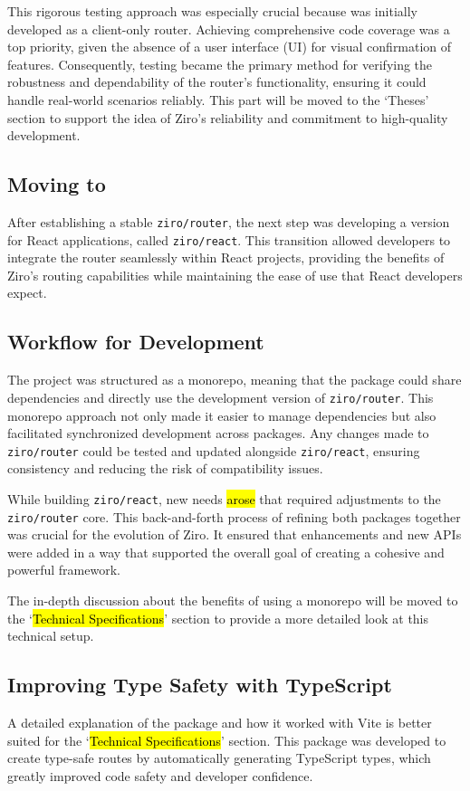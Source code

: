 This rigorous testing approach was especially crucial because  was initially developed as a client-only router. Achieving comprehensive code coverage was a top priority, given the absence of a user interface (UI) for visual confirmation of features. Consequently, testing became the primary method for verifying the robustness and dependability of the router’s functionality, ensuring it could handle real-world scenarios reliably. This part will be moved to the ‘Theses’ section to support the idea of Ziro’s reliability and commitment to high-quality development.

\subsection{Moving to }
After establishing a stable \texttt{ziro/router}, the next step was developing a version for React applications, called \texttt{ziro/react}. This transition allowed developers to integrate the router seamlessly within React projects, providing the benefits of Ziro’s routing capabilities while maintaining the ease of use that React developers expect.

\subsection{Workflow for Development}
The project was structured as a monorepo, meaning that the  package could share dependencies and directly use the development version of \texttt{ziro/router}. This monorepo approach not only made it easier to manage dependencies but also facilitated synchronized development across packages. Any changes made to \texttt{ziro/router} could be tested and updated alongside \texttt{ziro/react}, ensuring consistency and reducing the risk of compatibility issues.

While building \texttt{ziro/react}, new needs \hl{arose} that required adjustments to the \texttt{ziro/router} core. This back-and-forth process of refining both packages together was crucial for the evolution of Ziro. It ensured that enhancements and new APIs were added in a way that supported the overall goal of creating a cohesive and powerful framework.

The in-depth discussion about the benefits of using a monorepo will be moved to the ‘\hl{Technical Specifications}’ section to provide a more detailed look at this technical setup.

\subsection{Improving Type Safety with TypeScript}
A detailed explanation of the  package and how it worked with Vite is better suited for the ‘\hl{Technical Specifications}’ section. This package was developed to create type-safe routes by automatically generating TypeScript types, which greatly improved code safety and developer confidence.

